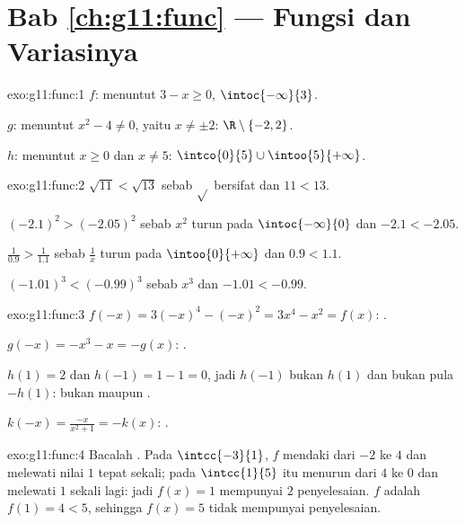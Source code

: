 \section*{Bab \ref{ch:g11:func} --- Fungsi dan Variasinya}

\begin{solution}{exo:g11:func:1}
$f$: menuntut $3 - x \geq 0$,  $\intoc{-\infty}{3}$.

$g$: menuntut $x^2 - 4 \neq 0$, yaitu $x \neq \pm 2$: 
$\R \setminus \{-2, 2\}$.

$h$: menuntut $x \geq 0$ dan $x \neq 5$: 
$\intco{0}{5} \cup \intoo{5}{+\infty}$.
\end{solution}

\begin{solution}{exo:g11:func:2}
$\sqrt{11} < \sqrt{13}$ sebab $\sqrt{}$ bersifat  dan $11 < 13$.

$(-2.1)^2 > (-2.05)^2$ sebab $x^2$ turun pada
$\intoc{-\infty}{0}$ dan $-2.1 < -2.05$.

$\frac{1}{0.9} > \frac{1}{1.1}$ sebab $\frac1x$ turun pada
$\intoo{0}{+\infty}$ dan $0.9 < 1.1$.

$(-1.01)^3 < (-0.99)^3$ sebab $x^3$  dan $-1.01 < -0.99$.
\end{solution}

\begin{solution}{exo:g11:func:3}
$f(-x) = 3(-x)^4 - (-x)^2 = 3x^4 - x^2 = f(x)$: .

$g(-x) = -x^3 - x = -g(x)$: .

$h(1) = 2$ dan $h(-1) = 1 - 1 = 0$, jadi $h(-1)$ bukan $h(1)$ dan bukan
pula $-h(1)$: bukan  maupun .

$k(-x) = \frac{-x}{x^2+1} = -k(x)$: .
\end{solution}

\begin{solution}{exo:g11:func:4}
Bacalah . Pada $\intcc{-3}{1}$, $f$ mendaki dari $-2$ ke $4$
dan melewati nilai $1$ tepat sekali; pada $\intcc{1}{5}$  itu menurun
dari $4$ ke $0$ dan melewati $1$ sekali lagi: jadi  $f(x) = 1$
mempunyai $2$ penyelesaian.  $f$ adalah $f(1) = 4 < 5$, sehingga
$f(x) = 5$ tidak mempunyai penyelesaian.
\end{solution}

